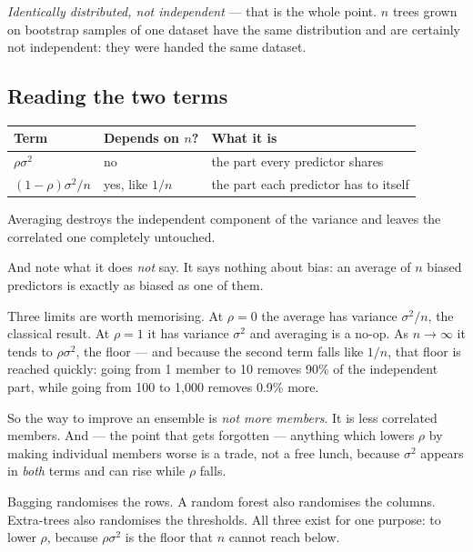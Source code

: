 \documentclass[11pt,a4paper]{article}
\begin{document}
\emph{Identically distributed, not independent} --- that is the whole point.
$n$ trees grown on bootstrap samples of one dataset have the same distribution
and are certainly not independent: they were handed the same dataset.

\subsection{Reading the two terms}

\begin{center}
\small
\begin{tabular}{lll}
\toprule
\textbf{Term} & \textbf{Depends on $n$?} & \textbf{What it is} \\
\midrule
$\rho\sigma^2$ & no & the part every predictor shares \\
$(1-\rho)\sigma^2/n$ & yes, like $1/n$ & the part each predictor has to itself \\
\bottomrule
\end{tabular}
\end{center}

\begin{keybox}[title={The sentence to remember}]
Averaging destroys the independent component of the variance and leaves the
correlated one completely untouched.

And note what it does \emph{not} say. It says nothing about bias: an average of
$n$ biased predictors is exactly as biased as one of them.
\end{keybox}

Three limits are worth memorising. At $\rho = 0$ the average has variance
$\sigma^2/n$, the classical result. At $\rho = 1$ it has variance $\sigma^2$
and averaging is a no-op. As $n \to \infty$ it tends to $\rho\sigma^2$, the
floor --- and because the second term falls like $1/n$, that floor is reached
quickly: going from 1 member to 10 removes 90\% of the independent part, while
going from 100 to 1{,}000 removes 0.9\% more.

So the way to improve an ensemble is \emph{not more members}. It is less
correlated members. And --- the point that gets forgotten --- anything which
lowers $\rho$ by making individual members worse is a trade, not a free lunch,
because $\sigma^2$ appears in \emph{both} terms and can rise while $\rho$
falls.

\begin{keybox}[title={One formula, three algorithms}]
Bagging randomises the rows. A random forest also randomises the columns.
Extra-trees also randomises the thresholds. All three exist for one purpose: to
lower $\rho$, because $\rho\sigma^2$ is the floor that $n$ cannot reach below.
\end{keybox}
\end{document}
